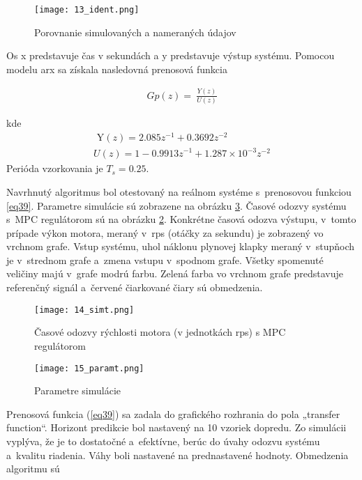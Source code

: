 \begin{figure}[!htbp]
\centering
\texttt{[image: 13\_ident.png]}
\caption{Porovnanie simulovaných a nameraných údajov}
\label{13_ident}
\end{figure}
Os x predstavuje čas v sekundách a y predstavuje výstup systému. Pomocou modelu arx sa získala nasledovná prenosová funkcia

\begin{equation} \label{eq38}
\begin{split}
Gp(z) = \ \frac{Y(z)}{U(z)}
\end{split}
\end{equation}

kde
\begin{equation} \label{eq39}
\begin{split}
\text{\ Y}\left( z \right) = 2.085z^{- 1} + 0.3692z^{- 2} \\
U\left( z \right) = 1 - 0.99{13z}^{- 1} + 1.287 \times 10^{- 3}z^{- 2}
\end{split}
\end{equation}
Perióda vzorkovania je \(T_{s} = 0.25\).

Navrhnutý algoritmus bol otestovaný na reálnom systéme s~prenosovou
funkciou \ref{eq39}. Parametre simulácie sú zobrazene na obrázku \ref{15_paramt}. Časové odozvy systému s~MPC regulátorom sú
na obrázku \ref{14_simt}. Konkrétne časová odozva výstupu, v~tomto prípade
výkon motora, meraný v~rps (otáčky za sekundu) je zobrazený vo vrchnom
grafe. Vstup systému, uhol náklonu plynovej klapky meraný v~stupňoch je
v~strednom grafe a~zmena vstupu v~spodnom grafe. Všetky spomenuté
veličiny majú v~grafe modrú farbu. Zelená farba vo vrchnom grafe
predstavuje referenčný signál a~červené čiarkované čiary sú obmedzenia.

\begin{figure}[!htbp]
\centering
\texttt{[image: 14\_simt.png]}
\caption{Časové odozvy rýchlosti motora (v jednotkách rps) s MPC regulátorom}
\label{14_simt}
\end{figure}

\begin{figure}[!htbp]
\centering
\texttt{[image: 15\_paramt.png]}
\caption{Parametre simulácie}
\label{15_paramt}
\end{figure}

Prenosová funkcia (\ref{eq39}) sa zadala do grafického rozhrania do pola
„transfer function``. Horizont predikcie bol nastavený na 10 vzoriek
dopredu. Zo simulácii vyplýva, že je to dostatočné a~efektívne, berúc do
úvahy odozvu systému a~kvalitu riadenia. Váhy boli nastavené na
prednastavené hodnoty. Obmedzenia algoritmu sú

